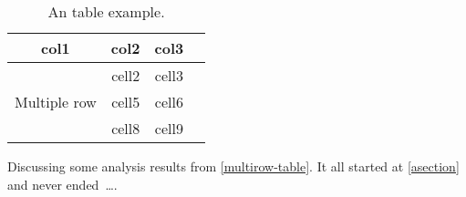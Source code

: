 \begin{table}[!htb]
    \centering
    \begin{tabular}{|c|c|c|c|}
        \hline
        col1 & col2 & col3 \\
        \hline
        \multirow{3}{4em}{Multiple row} & cell2 & cell3 \\
        & cell5 & cell6 \\
        & cell8 & cell9 \\
        \hline
    \end{tabular}
    \caption{An table example.}
    \label{multirow-table}
\end{table}

Discussing some analysis results from \autoref{multirow-table}.
It all started at \autoref{asection} and never ended~\dots.

